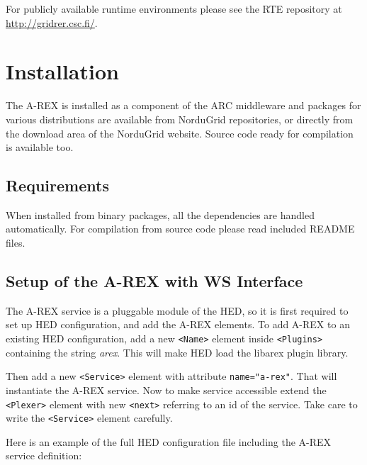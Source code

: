 \documentclass{article}                            %
\begin{document}
For publicly available runtime environments please see the RTE repository at \url{http://gridrer.csc.fi/}.

\section{Installation\label{sec:installation}}

The A-REX is installed as a component of the ARC middleware and
packages for various distributions are available from NorduGrid
repositories, or directly from the download area of the NorduGrid
website. Source code ready for compilation is available too.

\subsection{Requirements}

When installed from binary packages, all the dependencies are handled automatically.
For compilation from source code please read included README files.


\subsection{Setup of the A-REX with WS Interface}
\label{sec:wssetup}

The A-REX service is a pluggable module of the HED, so it is first
required to set up HED configuration, and add the A-REX elements. To
add A-REX to an existing HED configuration, add a new \verb|<Name>|
element inside \verb|<Plugins>| containing the string
\emph{arex}. This will make HED load the libarex plugin library.

Then add a new \verb|<Service>| element with attribute
\verb|name="a-rex"|. That will instantiate the A-REX service. Now to
make service accessible extend the \verb|<Plexer>| element with new
\verb|<next>| referring to an id of the service. Take care to write
the \verb|<Service>| element carefully.

Here is an example of the full HED configuration file including the
A-REX service definition:
\end{document}
